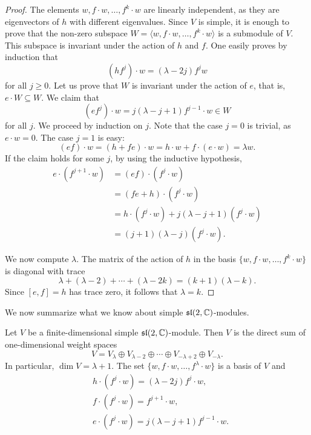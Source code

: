 \begin{proof}
    The elements $w,f\cdot w,\dots,f^{k}\cdot w$ 
    are linearly independent, as they are eigenvectors of $h$ with 
    different eigenvalues. Since $V$ is simple, it is enough 
    to prove that 
    the non-zero subspace $W=\langle w,f\cdot w,\dots,f^k\cdot w\rangle$ 
    is a submodule of $V$. This subspace 
    is invariant under the action of 
    $h$ and $f$. One easily proves by induction that 
    \[
    (hf^j)\cdot w=(\lambda-2j)f^jw
    \]
    for all $j\geq0$. 
    Let us prove that $W$ is invariant 
    under the action of $e$, that is, $e\cdot W\subseteq W$. 
    We claim that 
    \[
    (ef^{j})\cdot w=j(\lambda-j+1)f^{j-1}\cdot w\in W
    \]
    for all $j$. We proceed by induction on $j$. Note that 
    the case $j=0$ is trivial, as $e\cdot w=0$. 
    The case $j=1$ is easy:
    \[
    (ef)\cdot w=(h+fe)\cdot w=h\cdot w+f\cdot (e\cdot w)=\lambda w.
    \]
    If the claim holds for some $j$, by using 
    the inductive hypothesis, 
    \begin{align*}
        e\cdot(f^{j+1}\cdot w)&=(ef)\cdot (f^{j}\cdot w)\\
        &=(fe+h)\cdot (f^{j}\cdot w)\\
        &=h\cdot (f^j\cdot w)+j(\lambda-j+1)(f^j\cdot w)\\
        &=(j+1)(\lambda-j)(f^{j}\cdot w).
    \end{align*}
    
    We now compute $\lambda$. 
    The matrix of the action of $h$ in the basis 
    $\{w,f\cdot w,\dots,f^k\cdot w\}$ 
    is diagonal with trace 
    \[
    \lambda+(\lambda-2)+\cdots+(\lambda-2k)=(k+1)(\lambda-k).
    \]
    Since $[e,f]=h$ has trace zero, it follows that $\lambda=k$. 
\end{proof}

We now summarize what we know about 
simple $\mathfrak{sl}(2,\mathbb{C})$-modules.

\begin{theorem}
    Let $V$ be a finite-dimensional simple $\mathfrak{sl}(2,\mathbb{C})$-module.
    Then 
    $V$ is the direct sum of one-dimensional weight spaces
    \begin{equation}
    \label{eq:sl2_decomposition}
        V=V_{\lambda}\oplus V_{\lambda-2}\oplus\cdots\oplus V_{-\lambda+2}\oplus V_{-\lambda}.
    \end{equation}
    In particular, $\dim V=\lambda+1$. 
    The set $\{w,f\cdot w,\dots,f^\lambda\cdot w\}$ 
    is a basis of $V$ and 
    \begin{equation}
        \label{eq:sl2_module}
        \begin{aligned}
            &h\cdot (f^j\cdot w)=(\lambda-2j)f^j\cdot w,\\
            &f\cdot (f^j\cdot w)=f^{j+1}\cdot w,\\
            &e\cdot (f^j\cdot w)=j(\lambda-j+1)f^{j-1}\cdot w.
        \end{aligned}
    \end{equation}
\end{theorem}

